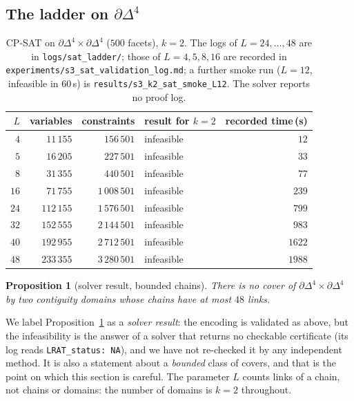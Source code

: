 \documentclass[12pt]{article}
\newtheorem{proposition}[theo]{Proposition}
\begin{document}
\subsection{The ladder on \texorpdfstring{$\partial\Delta^4$}{the 3-sphere model}}

\begin{table}[H]
\centering\footnotesize
\begin{tabular}{@{}rrrlr@{}}
\toprule
$L$ & variables & constraints & result for $k=2$ & recorded time\,(s) \\
\midrule
$4$ & $11\,155$ & $156\,501$ & infeasible & $12$\\
$5$ & $16\,205$ & $227\,501$ & infeasible & $33$\\
$8$ & $31\,355$ & $440\,501$ & infeasible & $77$\\
$16$ & $71\,755$ & $1\,008\,501$ & infeasible & $239$\\
$24$ & $112\,155$ & $1\,576\,501$ & infeasible & $799$\\
$32$ & $152\,555$ & $2\,144\,501$ & infeasible & $983$\\
$40$ & $192\,955$ & $2\,712\,501$ & infeasible & $1622$\\
$48$ & $233\,355$ & $3\,280\,501$ & infeasible & $1988$\\
\bottomrule
\end{tabular}
\caption{CP-SAT on $\partial\Delta^4\times\partial\Delta^4$ ($500$
facets), $k=2$.  The logs of $L=24,\dots,48$ are in
\texttt{logs/sat\_ladder/}; those of $L=4,5,8,16$ are recorded in
\texttt{experiments/s3\_sat\_validation\_log.md}; a further smoke run
($L=12$, infeasible in $60$\,s) is \texttt{results/s3\_k2\_sat\_smoke\_L12}.
The solver reports no proof log.}
\label{tab:sat}
\end{table}

\begin{proposition}[solver result, bounded chains]\label{prop:sat}
There is no cover of $\partial\Delta^4\times\partial\Delta^4$ by two
contiguity domains whose chains have at most $48$ links.
\end{proposition}

We label Proposition~\ref{prop:sat} as a \emph{solver result}: the
encoding is validated as above, but the infeasibility is the answer of a
solver that returns no checkable certificate (its log reads
\texttt{LRAT\_status: NA}), and we have not re-checked it by any
independent method.  It is also a statement about a \emph{bounded}
class of covers, and that is the point on which this section is
careful.  The parameter $L$ counts links of a chain, not chains or
domains: the number of domains is $k=2$ throughout.
\end{document}

